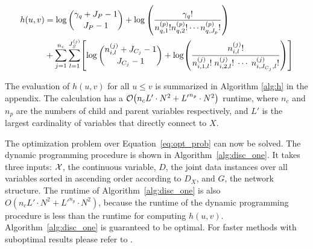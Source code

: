 \begin{small}
\begin{equation}
\begin{aligned}
h(u,v) &=  \log {{\gamma_{q} + J_P - 1}\choose{J_P-1}} + \log \left( { {{\gamma_q}!}\over{ {n^{(p)}_{q,1} !} {n^{(p)}_{q,2} !} \cdots {n^{(p)}_{q,J_p} !}} } \right) \\
& + \sum_{j=1}^{n_c} \sum_{l=1}^{J^{(j)}_S} \brock{
  { \log
          {{n^{(j)}_{i,l} + J_{C_j} - 1}\choose{J_{C_j}-1}}}        
    +
    \log \paren{ {
          \frac{
            {n^{(j)}_{i,l}}!
          }{
            {n^{(j)}_{i,1,l}!} \; {n^{(j)}_{i,2,l}!} \; \cdots \; {n^{(j)}_{i,J_{C_j},l}!}
          }
        }        
        } }
\end{aligned}
\end{equation}
\end{small}

The evaluation of $h(u,v)$ for all $u \leq v$ is summarized in Algorithm \ref{alg:h} in the appendix.
The calculation has a $\bigo \paren{ n_c  {L'} \cdot N^2 + {L'}^{n_p} \cdot N^2 }$ runtime, where $n_c$ and $n_p$ are the numbers of child and parent variables respectively, and $L'$ is the largest cardinality of variables that directly connect to $X$. 

The optimization problem over Equation~\ref{eq:opt_prob} can now be solved.
The dynamic programming procedure is shown in Algorithm~\ref{alg:disc_one}.
It takes three inputs: $\mathcal{X}$, the continuous variable, $D$, the joint data instances over all variables sorted in ascending order according to $D_X$, and $G$, the network structure.
The runtime of Algorithm~\ref{alg:disc_one} is also $O(n_c  {L'} \cdot N^2 + {L'}^{n_p} \cdot N^2)$, because the runtime of the dynamic programming procedure is less than the runtime for computing $h(u,v)$.
Algorithm~\ref{alg:disc_one} is guaranteed to be optimal.
For faster methods with suboptimal results please refer to \citep{Boulle_2006}.

